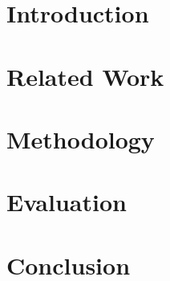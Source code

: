 \documentclass[10pt,twocolumn,letterpaper]{article}
\begin{document}
\section{Introduction}
\label{sec:intro}


\section{Related Work}
\label{sec:related}


\section{Methodology}
\label{sec:method}


\section{Evaluation}
\label{sec:evaluation}


\section{Conclusion}
\label{sec:conclusion}


{\small


}
\end{document}
